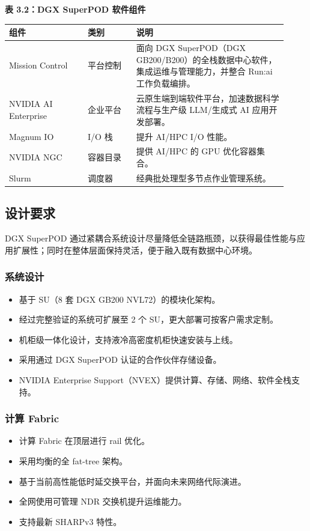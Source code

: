\documentclass[10pt]{article}
\newcounter{none}
\begin{document}
\textbf{表 3.2：DGX SuperPOD 软件组件}

{\def\LTcaptype{none}
\begin{longtable}{|p{0.26\linewidth}|p{0.16\linewidth}|p{0.5\linewidth}|}
\hline
\textbf{组件} & \textbf{类别} & \textbf{说明} \\
\hline
Mission Control & 平台控制 & 面向 DGX SuperPOD（DGX GB200/B200）的全栈数据中心软件，集成运维与管理能力，并整合 Run:ai 工作负载编排。 \\
\hline
NVIDIA AI Enterprise & 企业平台 & 云原生端到端软件平台，加速数据科学流程与生产级 LLM/生成式 AI 应用开发部署。 \\
\hline
Magnum IO & I/O 栈 & 提升 AI/HPC I/O 性能。 \\
\hline
NVIDIA NGC & 容器目录 & 提供 AI/HPC 的 GPU 优化容器集合。 \\
\hline
Slurm & 调度器 & 经典批处理型多节点作业管理系统。 \\
\hline
\end{longtable}
}

\subsection{设计要求}
DGX SuperPOD 通过紧耦合系统设计尽量降低全链路瓶颈，以获得最佳性能与应用扩展性；同时在整体层面保持灵活，便于融入既有数据中心环境。

\subsubsection{系统设计}
\begin{itemize}
\item 基于 SU（8 套 DGX GB200 NVL72）的模块化架构。
\item 经过完整验证的系统可扩展至 2 个 SU，更大部署可按客户需求定制。
\item 机柜级一体化设计，支持液冷高密度机柜快速安装与上线。
\item 采用通过 DGX SuperPOD 认证的合作伙伴存储设备。
\item NVIDIA Enterprise Support（NVEX）提供计算、存储、网络、软件全栈支持。
\end{itemize}

\subsubsection{计算 Fabric}
\begin{itemize}
\item 计算 Fabric 在顶层进行 rail 优化。
\item 采用均衡的全 fat-tree 架构。
\item 基于当前高性能低时延交换平台，并面向未来网络代际演进。
\item 全网使用可管理 NDR 交换机提升运维能力。
\item 支持最新 SHARPv3 特性。
\end{itemize}
\end{document}
